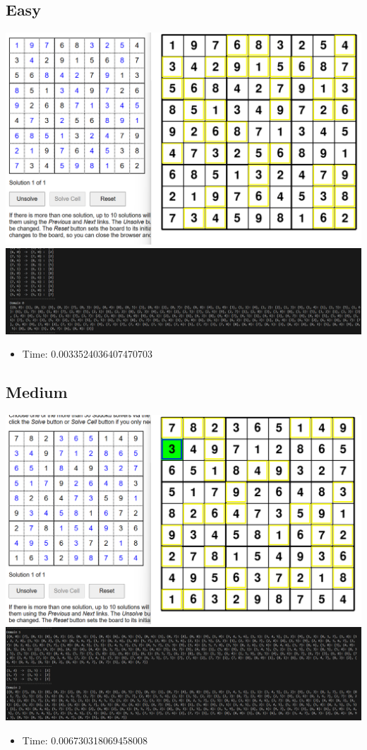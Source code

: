 \documentclass{article}
\begin{document}
\subsection*{Easy}
\begin{center}
    \includegraphics[width=0.8\linewidth]{easy.png}
    \includegraphics[width=0.8\linewidth]{easy_sample.png}
\end{center}
\begin{itemize}
    \item Time: 0.0033524036407470703
\end{itemize}
\subsection*{Medium}
\begin{center}
    \includegraphics[width=0.8\linewidth]{Medium.png}
    \includegraphics[width=0.8\linewidth]{Medium_sample.png}
\end{center}
\begin{itemize}
    \item Time: 0.006730318069458008
\end{itemize}
\end{document}
